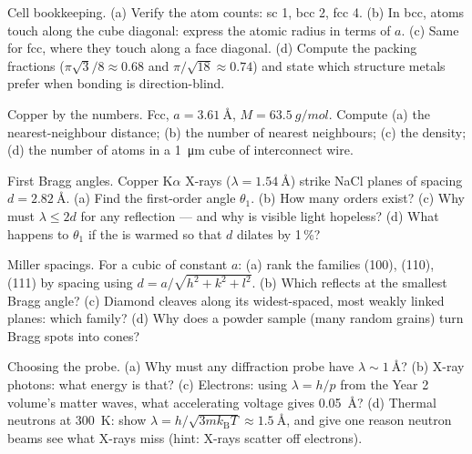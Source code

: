 \begin{exercise}[$\star$]\label{exo:b3:crystalline-solids:1}
Cell bookkeeping. (a) Verify the atom counts: sc 1, bcc 2, fcc 4.
(b) In bcc, atoms touch along the cube diagonal: express the atomic
radius in terms of $a$. (c) Same for fcc, where they touch along a
face diagonal. (d) Compute the packing fractions
($\pi\sqrt3/8 \approx 0.68$ and $\pi/\sqrt{18} \approx 0.74$) and
state which structure metals prefer when bonding is
direction-blind.
\end{exercise}

\begin{exercise}[$\star$]\label{exo:b3:crystalline-solids:2}
Copper by the numbers. Fcc, $a = \qty{3.61}{\angstrom}$, $M =
\qty{63.5}{g/mol}$. Compute (a) the nearest-neighbour distance;
(b) the number of nearest neighbours; (c) the density; (d) the
number of atoms in a \qty{1}{\micro m} cube of interconnect wire.
\end{exercise}

\begin{exercise}[$\star$]\label{exo:b3:crystalline-solids:3}
First Bragg angles. Copper K$\alpha$ X-rays
($\lambda = \qty{1.54}{\angstrom}$) strike NaCl planes of spacing
$d = \qty{2.82}{\angstrom}$. (a) Find the first-order angle
$\theta_1$. (b) How many orders exist? (c) Why must
$\lambda \le 2d$ for any reflection --- and why is visible light
hopeless? (d) What happens to $\theta_1$ if the  is warmed
so that $d$ dilates by 1\,\%?
\end{exercise}

\begin{exercise}[$\star$]\label{exo:b3:crystalline-solids:4}
Miller spacings. For a cubic  of constant $a$: (a) rank the
families (100), (110), (111) by spacing using
$d = a/\sqrt{h^2+k^2+l^2}$. (b) Which reflects at the smallest
Bragg angle? (c) Diamond cleaves along its widest-spaced, most
weakly linked planes: which family? (d) Why does a powder sample
(many random grains) turn Bragg spots into cones?
\end{exercise}

\begin{exercise}[$\star\star$]\label{exo:b3:crystalline-solids:5}
Choosing the probe. (a) Why must any diffraction probe have
$\lambda \sim \qty{1}{\angstrom}$? (b) X-ray photons: what energy
is that? (c) Electrons: using $\lambda = h/p$ from the Year 2
volume's matter waves, what accelerating voltage gives
\qty{0.05}{\angstrom}? (d) Thermal neutrons at \qty{300}{K}: show
$\lambda = h/\sqrt{3mk_{\text{B}}T} \approx \qty{1.5}{\angstrom}$,
and give one reason neutron beams see what X-rays miss (hint:
X-rays scatter off electrons).
\end{exercise}

